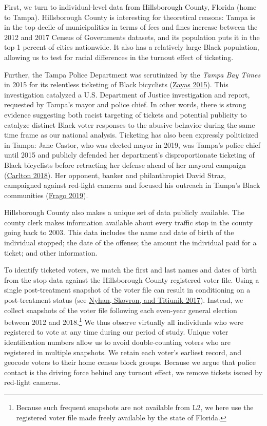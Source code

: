 \documentclass[
  12pt,
]{article}
\begin{document}
First, we turn to individual-level data from Hillsborough County, Florida (home to Tampa). Hillsborough County is interesting for theoretical reasons: Tampa is in the top decile of municipalities in terms of fees and fines increase between the 2012 and 2017 Census of Governments datasets, and its population puts it in the top 1 percent of cities nationwide. It also has a relatively large Black population, allowing us to test for racial differences in the turnout effect of ticketing.

Further, the Tampa Police Department was scrutinized by the \emph{Tampa Bay Times} in 2015 for its relentless ticketing of Black bicyclists (\protect\hyperlink{ref-Zayas2015}{Zayas 2015}). This investigation catalyzed a U.S. Department of Justice investigation and report, requested by Tampa's mayor and police chief. In other words, there is strong evidence suggesting both racist targeting of tickets and potential publicity to catalyze distinct Black voter responses to the abusive behavior during the same time frame as our national analysis. Ticketing has also been expressly politicized in Tampa: Jane Castor, who was elected mayor in 2019, was Tampa's police chief until 2015 and publicly defended her department's disproportionate ticketing of Black bicyclists before retracting her defense ahead of her mayoral campaign (\protect\hyperlink{ref-Carlton2018}{Carlton 2018}). Her opponent, banker and philanthropist David Straz, campaigned against red-light cameras and focused his outreach in Tampa's Black communities (\protect\hyperlink{ref-Frago2019}{Frago 2019}).

Hillsborough County also makes a unique set of data publicly available. The county clerk makes information available about every traffic stop in the county going back to 2003. This data includes the name and date of birth of the individual stopped; the date of the offense; the amount the individual paid for a ticket; and other information.

To identify ticketed voters, we match the first and last names and dates of birth from the stop data against the Hillsborough County registered voter file. Using a single post-treatment snapshot of the voter file can result in conditioning on a post-treatment status (see \protect\hyperlink{ref-Nyhan2017}{Nyhan, Skovron, and Titiunik 2017}). Instead, we collect snapshots of the voter file following each even-year general election between 2012 and 2018.\footnote{Because such frequent snapshots are not available from L2, we here use the registered voter file made freely available by the state of Florida.} We thus observe virtually all individuals who were registered to vote at any time during our period of study. Unique voter identification numbers allow us to avoid double-counting voters who are registered in multiple snapshots. We retain each voter's earliest record, and geocode voters to their home census block groups. Because we argue that police contact is the driving force behind any turnout effect, we remove tickets issued by red-light cameras.
\end{document}
